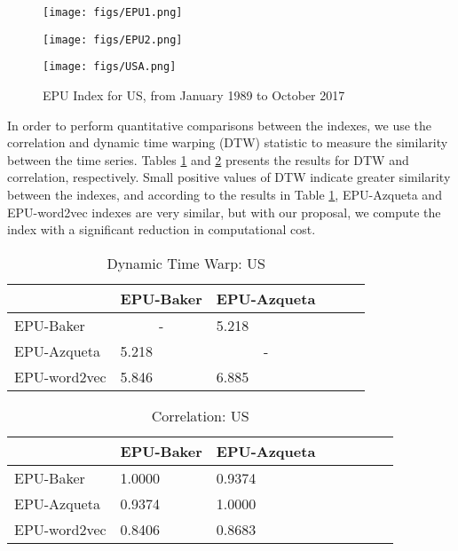 \documentclass{article}
\begin{document}
\begin{figure}[H] 
    \begin{minipage}[b]{0.33\linewidth}
    \centering
    \texttt{[image: figs/EPU1.png]}
    \end{minipage}
    \begin{minipage}[b]{0.33\linewidth}
    \centering
    \texttt{[image: figs/EPU2.png]}
    \end{minipage}
    \begin{minipage}[b]{0.33\linewidth}
    \centering
    \texttt{[image: figs/USA.png]}
    \end{minipage}
\caption{EPU Index for US, from January 1989 to October 2017}
\label{fig:chap3.fig29}
\end{figure}

In order to perform quantitative comparisons between the indexes, we use the correlation and dynamic time warping (DTW) statistic \citep{Muller2007} to measure the similarity between the time series. Tables \ref{table:dtwUS} and \ref{table:correlationUS} presents the results for DTW and correlation, respectively. Small positive values of DTW indicate greater similarity between the indexes, and according to the results in Table \ref{table:dtwUS}, EPU-Azqueta and EPU-word2vec indexes are very similar, but with our proposal, we compute the index with a significant reduction in computational cost.   

\begin{table}[h]
\footnotesize
 \centering
 \begin{tabular}{llllll}
\toprule
       & 	EPU-Baker	&EPU-Azqueta	\\
   \midrule
EPU-Baker &\multicolumn{1}{c}{-}	&5.218 \\
EPU-Azqueta &5.218	&\multicolumn{1}{c}{-} \\
EPU-word2vec  &5.846	&6.885\\
\bottomrule
\end{tabular}
\caption{Dynamic Time Warp: US}
\label{table:dtwUS}
\end{table}    

\begin{table}[h]
\footnotesize
 \centering
 \begin{tabular}{llllllll}
    \toprule
       & 	EPU-Baker	&EPU-Azqueta	\\
   \midrule
EPU-Baker	&1.0000	&0.9374	\\
EPU-Azqueta	&0.9374	&1.0000	\\
EPU-word2vec 	&0.8406	&0.8683		\\
\bottomrule
\end{tabular}
\caption{Correlation: US}
\label{table:correlationUS}
\end{table}    
\end{document}
